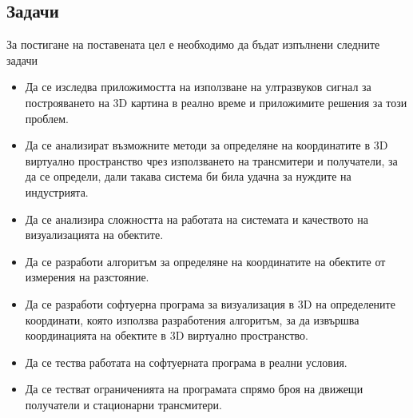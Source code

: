 \subsection{Задачи}
За постигане на поставената цел е необходимо да бъдат изпълнени следните задачи
\begin{itemize}
    \item Да се изследва приложимостта на използване на ултразвуков сигнал за построяването на 3D картина в реално време и приложимите решения за този проблем.
      
    \item Да се анализират възможните методи за определяне на координатите в 3D виртуално пространство чрез използването на трансмитери и получатели, за да се определи, дали такава система би била удачна за нуждите на индустрията.
    
    \item Да се анализира сложността на работата на системата и качеството на визуализацията на обектите.
    
    \item Да се разработи алгоритъм за определяне на координатите на обектите от измерения на разстояние.
    
    \item Да се разработи софтуерна програма за визуализация в 3D на определените координати, която използва разработения алгоритъм, за да извършва координацията на обектите в 3D виртуално пространство.
    
    \item Да се тества работата на софтуерната програма в реални условия.
    
    \item Да се тестват ограниченията на програмата спрямо броя на движещи получатели и стационарни трансмитери.
\end{itemize}